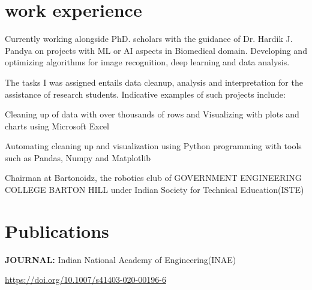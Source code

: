\documentclass[]{deedy-resume-openfont}
\begin{document}
\section{work experience}

Currently working alongside PhD. scholars with the guidance of Dr. Hardik J. Pandya on projects with ML or AI aspects in Biomedical domain. Developing and optimizing algorithms for image recognition, deep learning and data analysis. 
\sectionsep

The tasks I was assigned entails data cleanup, analysis and interpretation for the assistance of research students.
Indicative examples of such projects include:
\begin{tightemize}
\item Cleaning up of data with over thousands of rows and Visualizing with plots and charts using Microsoft Excel
\item Automating cleaning up and visualization using Python programming with tools such as Pandas, Numpy and Matplotlib
\end{tightemize}
\sectionsep

\sectionsep

Chairman at Bartonoidz, the robotics club of GOVERNMENT ENGINEERING COLLEGE BARTON HILL under Indian Society for Technical Education(ISTE)
\sectionsep

\section{Publications}
\textbf{JOURNAL: }
{Indian National Academy of Engineering(INAE)}

\href{https://doi.org/10.1007/s41403-020-00196-6}{https://doi.org/10.1007/s41403-020-00196-6}
\sectionsep
\end{document}
